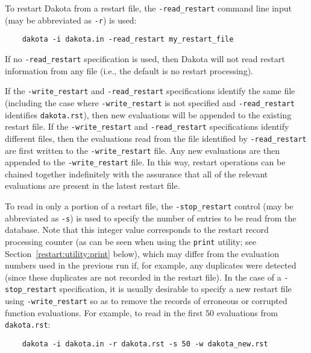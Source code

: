 To restart Dakota from a restart file, the \texttt{-read\_restart}
command line input (may be abbreviated as \texttt{-r}) is used:
\begin{small}
\begin{verbatim}
    dakota -i dakota.in -read_restart my_restart_file
\end{verbatim}
\end{small}

If no \texttt{-read\_restart} specification is used, then Dakota will
not read restart information from any file (i.e., the default is no
restart processing).

If the \texttt{-write\_restart} and \texttt{-read\_restart}
specifications identify the same file (including the case where
\texttt{-write\_restart} is not specified and \texttt{-read\_restart}
identifies \texttt{dakota.rst}), then new evaluations will be appended
to the existing restart file. If the \texttt{-write\_restart} and
\texttt{-read\_restart} specifications identify different files, then
the evaluations read from the file identified by
\texttt{-read\_restart} are first written to the
\texttt{-write\_restart} file. Any new evaluations are then appended
to the \texttt{-write\_restart} file. In this way, restart operations
can be chained together indefinitely with the assurance that all of
the relevant evaluations are present in the latest restart file.

To read in only a portion of a restart file, the
\texttt{-stop\_restart} control (may be abbreviated as \texttt{-s}) is
used to specify the number of entries to be read from the
database. Note that this integer value corresponds to the restart
record processing counter (as can be seen when using the
\texttt{print} utility; see Section~\ref{restart:utility:print} below),
which may differ from the evaluation numbers used in the previous run
if, for example, any duplicates were detected (since these duplicates
are not recorded in the restart file).  In the case of a
\texttt{-stop\_restart} specification, it is usually desirable to
specify a new restart file using \texttt{-write\_restart} so as to
remove the records of erroneous or corrupted function evaluations. For
example, to read in the first 50 evaluations from
\texttt{dakota.rst}:
\begin{small}
\begin{verbatim}
    dakota -i dakota.in -r dakota.rst -s 50 -w dakota_new.rst
\end{verbatim}
\end{small}

